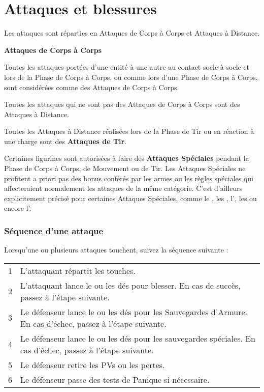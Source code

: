 
\part{Attaques et blessures}
\label{attacks_and_damage}

Les attaques sont réparties en Attaques de Corps à Corps et Attaques à Distance.

\noindent\textbf{Attaques de Corps à Corps}

Toutes les attaques portées d'une entité à une autre au contact socle à socle et lors de la Phase de Corps à Corps, ou comme lors d'une Phase de Corps à Corps, sont considérées comme des Attaques de Corps à Corps.

\noindent\textbf{}

Toutes les attaques qui ne sont pas des Attaques de Corps à Corps sont des Attaques à Distance.

Toutes les Attaques à Distance réalisées lors de la Phase de Tir ou en réaction à une charge sont des \textbf{Attaques de Tir}.

\noindent\textbf{}

Certaines figurines sont autorisées à faire des \textbf{Attaques Spéciales} pendant la Phase de Corps à Corps, de Mouvement ou de Tir. Les Attaques Spéciales ne profitent a priori pas des bonus conférés par les armes ou les règles spéciales qui affecteraient normalement les attaques de la même catégorie. C'est d'ailleurs explicitement précisé pour certaines Attaques Spéciales, comme le \stomp{}, les \grindingattacks{}, l'\crushattack{}, les \impacthits{} ou encore l'\breathweapon{}.

\section{Séquence d'une attaque}

Lorsqu'une ou plusieurs attaques touchent, suivez la séquence suivante :

\hspace*{0.3cm}
\begin{tabular}{c|m{14cm}}
1 & L'attaquant répartit les touches. \tabularnewline
2 & L'attaquant lance le ou les dés pour blesser. En cas de succès, passez à l'étape suivante. \tabularnewline 
3 & Le défenseur lance le ou les dés pour les Sauvegardes d'Armure. En cas d'échec, passez à l'étape suivante. \tabularnewline
4 & Le défenseur lance le ou les dés pour les sauvegardes spéciales. En cas d'échec, passez à l'étape suivante. \tabularnewline
5 & Le défenseur retire les PVs ou les pertes. \tabularnewline
6 & Le défenseur passe des tests de Panique si nécessaire. \tabularnewline
\end{tabular}

